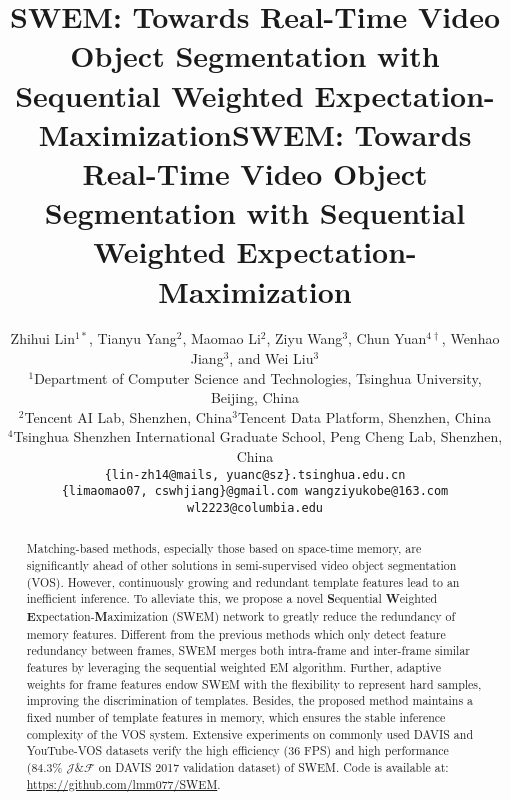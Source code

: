 \title{SWEM: Towards Real-Time Video Object Segmentation with Sequential Weighted Expectation-Maximization}



\title{SWEM: Towards Real-Time Video Object Segmentation with Sequential Weighted Expectation-Maximization}

\author{Zhihui Lin${^{1*}}$, Tianyu Yang${^{2}}$, Maomao Li${^2}$, Ziyu Wang${^3}$, Chun Yuan${^{4\dag}}$, Wenhao Jiang${^3}$, and Wei Liu${^3}$ \\
${^1}$Department of Computer Science and Technologies, Tsinghua University, Beijing, China \\
${^2}$Tencent AI Lab, Shenzhen, China\quad ${^3}$Tencent Data Platform, Shenzhen, China \\
${^4}$Tsinghua Shenzhen International Graduate School, Peng Cheng Lab, Shenzhen, China \\
{\tt\small \{lin-zh14@mails,\ yuanc@sz\}.tsinghua.edu.cn}  \\
{\tt\small \{limaomao07,\ cswhjiang\}@gmail.com \quad wangziyukobe@163.com \quad wl2223@columbia.edu}
}

\maketitle

\begin{abstract}
   Matching-based methods, especially those based on space-time memory, are significantly ahead of other solutions in semi-supervised video object segmentation (VOS). However, continuously growing and redundant template features lead to an inefficient inference. To alleviate this, we propose a novel \textbf{S}equential \textbf{W}eighted \textbf{E}xpectation-\textbf{M}aximization (SWEM) network to greatly reduce the redundancy of memory features. Different from the previous methods which only detect feature redundancy between frames, SWEM merges both intra-frame and inter-frame similar features by leveraging the sequential weighted EM algorithm. Further, adaptive weights for frame features endow SWEM with the flexibility to represent hard samples, improving the discrimination of templates. 
   Besides, the proposed method maintains a fixed number of template features in memory, which ensures the stable inference complexity of the VOS system. Extensive experiments on commonly used DAVIS and YouTube-VOS datasets verify the high efficiency (36 FPS) and high performance (84.3\% $\mathcal{J}\&\mathcal{F}$ on DAVIS 2017 validation dataset) of SWEM. Code is available at: \url{https://github.com/lmm077/SWEM}.
\end{abstract}

